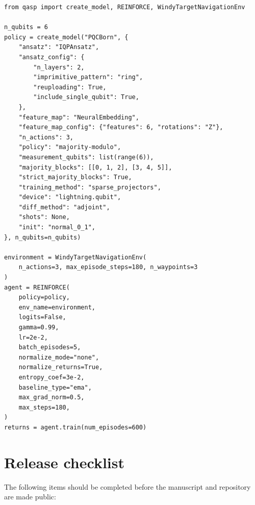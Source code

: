 \documentclass[10pt]{article}
\begin{document}
\begin{lstlisting}[caption={Three-action majority--modulo training on the bundled windy-navigation environment.},label={lst:windy-policy}]
from qasp import create_model, REINFORCE, WindyTargetNavigationEnv

n_qubits = 6
policy = create_model("PQCBorn", {
    "ansatz": "IQPAnsatz",
    "ansatz_config": {
        "n_layers": 2,
        "imprimitive_pattern": "ring",
        "reuploading": True,
        "include_single_qubit": True,
    },
    "feature_map": "NeuralEmbedding",
    "feature_map_config": {"features": 6, "rotations": "Z"},
    "n_actions": 3,
    "policy": "majority-modulo",
    "measurement_qubits": list(range(6)),
    "majority_blocks": [[0, 1, 2], [3, 4, 5]],
    "strict_majority_blocks": True,
    "training_method": "sparse_projectors",
    "device": "lightning.qubit",
    "diff_method": "adjoint",
    "shots": None,
    "init": "normal_0_1",
}, n_qubits=n_qubits)

environment = WindyTargetNavigationEnv(
    n_actions=3, max_episode_steps=180, n_waypoints=3
)
agent = REINFORCE(
    policy=policy,
    env_name=environment,
    logits=False,
    gamma=0.99,
    lr=2e-2,
    batch_episodes=5,
    normalize_mode="none",
    normalize_returns=True,
    entropy_coef=3e-2,
    baseline_type="ema",
    max_grad_norm=0.5,
    max_steps=180,
)
returns = agent.train(num_episodes=600)
\end{lstlisting}

\section{Release checklist}
\label{app:release}

The following items should be completed before the manuscript and repository are made public:
\end{document}
